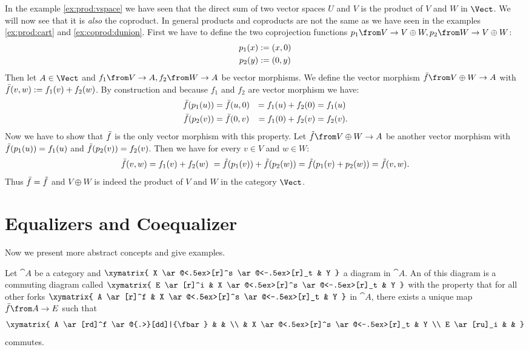 \begin{example}
  \label{ex:coprod:vspace}
  In the example \ref{ex:prod:vspace} we have seen that the direct sum of two vector spaces $U$ and $V$ is the product of $V$ and $W$ in $\Vect$.
  We will now see that it is \emph{also} the coproduct.
  In general products and coproducts are not the same as we have seen in the examples \ref{ex:prod:cart} and \ref{ex:coprod:dunion}.
  First we have to define the two coprojection functions $p_1 \from V \to V \oplus W, p_2 \from W \to V \oplus W$:
  \begin{alignat*}{2}
    p_1(x) &:= \left( x , 0 \right) \\
    p_2(y) &:= \left( 0 , y \right)
  \end{alignat*}
  Then let $A \in \Vect$ and $f_1 \from V \to A, f_2 \from W \to A$ be vector morphisms.
  We define the vector morphism $\fbar \from V \oplus W \to A$ with $\bar{f}(v, w) := f_1(v) + f_2(w)$.
  By construction and because $f_1$ and $f_2$ are vector morphism we have:
  \begin{alignat*}{4}
    \bar{f}(p_1(u)) &= \bar{f}(u, 0) &= f_1(u) + f_2(0) &= f_1(u) \\
    \bar{f}(p_2(v)) &= \bar{f}(0, v) &= f_1(0) + f_2(v) &= f_2(v).
  \end{alignat*}
  Now we have to show that $\bar{f}$ is the only vector morphism with this property.
  Let $\ftilde \from V \oplus W \to A$ be another vector morphism with $\tilde{f}(p_1(u)) = f_1(u)$ and $\tilde{f}(p_2(v)) = f_2(v)$.
  Then we have for every $v \in V$ and $w \in W$:
  $$ \bar{f}(v,w) = f_1(v) + f_2(w)\ = \tilde{f}(p_1(v)) + \tilde{f}(p_2(w)) = \tilde{f}(p_1(v) + p_2(w)) = \tilde{f}(v, w). $$
  Thus $\bar{f} = \tilde{f}$ and $V \oplus W$ is indeed the product of $V$ and $W$ in the category $\Vect$.
\end{example}

\section*{Equalizers and Coequalizer}

Now we present more abstract concepts and give examples.

\begin{definition}[Equalizer]
  \label{def:equa}
  Let $\cat{A}$ be a category and
  $ \xymatrix{
    X \ar@<.5ex>[r]^s \ar@<-.5ex>[r]_t & Y
  } $
  a diagram in $\cat{A}$.
  An  of this diagram is a commuting diagram called 
  $ \xymatrix{
    E \ar[r]^i & X \ar@<.5ex>[r]^s \ar@<-.5ex>[r]_t & Y
  } $
  with the property that for all other forks
  $ \xymatrix{
    A \ar[r]^f & X \ar@<.5ex>[r]^s \ar@<-.5ex>[r]_t & Y
  } $
  in $\cat{A}$, there exists a unique map $\fbar\from A \to E$ such that
  \[ \xymatrix{
    A \ar[rd]^f \ar@{.>}[dd]|{\fbar} & & \\
    & X \ar@<.5ex>[r]^s \ar@<-.5ex>[r]_t & Y \\
    E \ar[ru]_i & &
  } \]
  commutes.
\end{definition}

